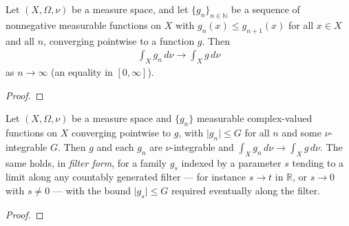 \begin{theorem}
    \label{thrm:monotone-convergence-theorem-for-integrals}
    \leanok
    Let $(X, \Omega, \nu)$ be a measure space, and let $\{ g_n \}_{n \in \mathbb{N}}$ be a sequence of nonnegative measurable functions on $X$ with $g_n(x) \le g_{n+1}(x)$ for all $x \in X$ and all $n$, converging pointwise to a function $g$. Then
    \begin{align}
        \int_X g_n \, d\nu \longrightarrow \int_X g \, d\nu
    \end{align}
    as $n \to \infty$ (an equality in $[0, \infty]$).
\end{theorem}
\begin{proof}
\leanok
\end{proof}

\begin{theorem}
    \label{thrm:dominated-convergence-theorem}
    \leanok
    Let $(X,\Omega,\nu)$ be a measure space and $\{g_n\}$ measurable complex-valued functions on $X$ converging pointwise to $g$, with $\lvert g_n \rvert \le G$ for all $n$ and some $\nu$-integrable $G$. Then $g$ and each $g_n$ are $\nu$-integrable and $\int_X g_n \, d\nu \to \int_X g \, d\nu$. The same holds, in \textit{filter form}, for a family $g_s$ indexed by a parameter $s$ tending to a limit along any countably generated filter — for instance $s \to t$ in $\mathbb{R}$, or $s \to 0$ with $s \ne 0$ — with the bound $\lvert g_s \rvert \le G$ required eventually along the filter.
\end{theorem}
\begin{proof}
\leanok
\end{proof}

